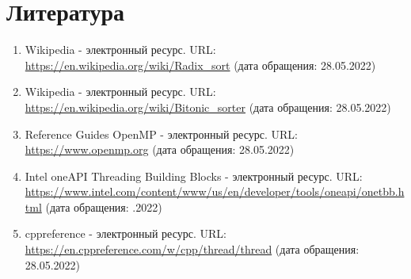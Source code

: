\documentclass{report}
\begin{document}
\section*{Литература}
\begin{enumerate}
\item Wikipedia - электронный ресурс. URL: \url{https://en.wikipedia.org/wiki/Radix_sort} (дата обращения: 28.05.2022)
\item Wikipedia - электронный ресурс. URL: \url{https://en.wikipedia.org/wiki/Bitonic_sorter} (дата обращения: 28.05.2022)
\item Reference Guides OpenMP - электронный ресурс. URL: \url{https://www.openmp.org} (дата обращения: 28.05.2022)
\item Intel oneAPI Threading Building Blocks - электронный ресурс. URL: \url{https://www.intel.com/content/www/us/en/developer/tools/oneapi/onetbb.html} (дата обращения: .2022)
\item cppreference - электронный ресурс. URL: \url{https://en.cppreference.com/w/cpp/thread/thread} (дата обращения: 28.05.2022)
\end{enumerate} 
\newpage

\end{document}
